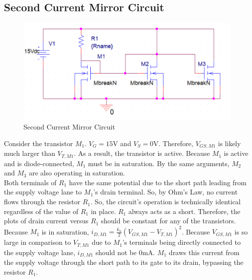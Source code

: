 \subsection{Second Current Mirror Circuit}

\FloatBarrier

\begin{figure}[h!]
	\centering
	\includegraphics[scale=0.75]{./images/circuit5.PNG}
	\caption{Second Current Mirror Circuit}
	\label{fig:circuit5}
\end{figure}

\FloatBarrier

Consider the transistor $M_1$. $V_G = 15$\si{\volt} and $V_S = 0$\si{\volt}. Therefore, $V_{GS,M1}$ is likely much larger than $V_{T,M1}$. As a result, the transistor is active. Because $M_1$ is active and is diode-connected, $M_1$ must be in saturation. By the same arguments, $M_2$ and $M_3$ are also operating in saturation.\\

Both terminals of $R_1$ have the same potential due to the short path leading from the supply voltage lane to $M_1$'s drain terminal. So, by Ohm's Law, no current flows through the resistor $R_1$. So, the circuit's operation is technically identical regardless of the value of $R_1$ in place. $R_1$ always acts as a short. Therefore, the plots of drain current versus $R_1$ should be constant for any of the transistors.\\

Because $M_1$ is in saturation, $i_{D,M1} = \frac{ k_n }{ 2 } ( V_{GS,M1} - V_{T,M1} )^2$. Because $V_{GS,M1}$ is so large in comparison to $V_{T,M1}$ due to $M_1$'s terminals being directly connected to the supply voltage lane, $i_{D,M1}$ should not be $0$\si{\milli\ampere}. $M_1$ draws this current from the supply voltage through the short path to its gate to its drain, bypassing the resistor $R_1$.\\


